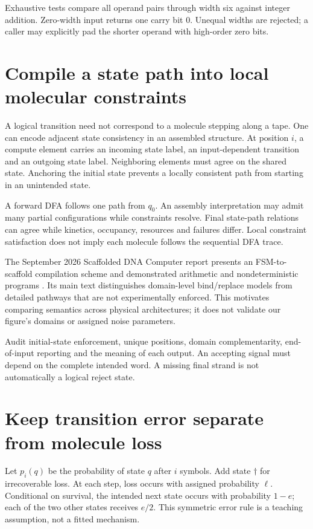 Exhaustive tests compare all operand pairs through width six against integer
addition. Zero-width input returns one carry bit 0. Unequal widths are rejected;
a caller may explicitly pad the shorter operand with high-order zero bits.

\section{Compile a state path into local molecular constraints}
A logical transition need not correspond to a molecule stepping along a tape.
One can encode adjacent state consistency in an assembled structure.
At position $i$, a compute element carries an incoming state label, an
input-dependent transition and an outgoing state label. Neighboring elements
must agree on the shared state. Anchoring the initial state prevents a locally
consistent path from starting in an unintended state.

A forward DFA follows one path from $q_0$. An assembly interpretation may admit
many partial configurations while constraints resolve. Final state-path relations
can agree while kinetics, occupancy, resources and failures differ.
Local constraint satisfaction does not imply each molecule follows the sequential
DFA trace.

The September 2026 Scaffolded DNA Computer report presents an FSM-to-scaffold
compilation scheme and demonstrated arithmetic and nondeterministic programs
\cite{Sterin2026}. Its main text distinguishes domain-level bind/replace models from
detailed pathways that are not experimentally enforced. This motivates comparing
semantics across physical architectures; it does not validate our figure's
domains or assigned noise parameters.

Audit initial-state enforcement, unique positions, domain complementarity,
end-of-input reporting and the meaning of each output. An accepting signal must
depend on the complete intended word. A missing final strand is not automatically
a logical reject state.

\section{Keep transition error separate from molecule loss}
Let $p_i(q)$ be the probability of state $q$ after $i$ symbols. Add state
$\dagger$ for irrecoverable loss. At each step, loss occurs with assigned
probability $\ell$. Conditional on survival, the intended next state occurs
with probability $1-e$; each of the two other states receives $e/2$.
This symmetric error rule is a teaching assumption, not a fitted mechanism.

